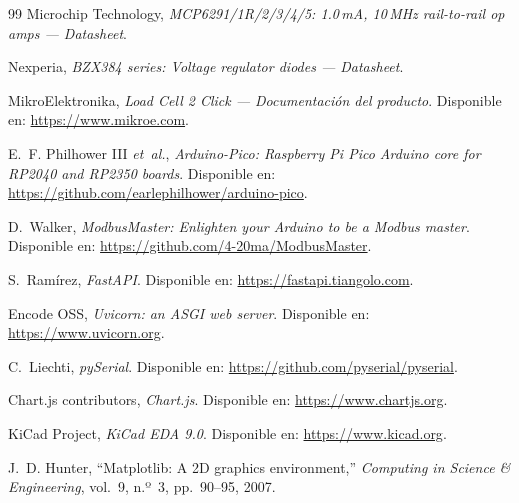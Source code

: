 \begin{thebibliography}{99}
Microchip Technology, \emph{MCP6291/1R/2/3/4/5: 1.0\,mA, 10\,MHz rail-to-rail op amps ---
Datasheet}.

Nexperia, \emph{BZX384 series: Voltage regulator diodes --- Datasheet}.

MikroElektronika, \emph{Load Cell 2 Click --- Documentación del producto}.
Disponible en: \url{https://www.mikroe.com}.

E.~F. Philhower III \emph{et~al.}, \emph{Arduino-Pico: Raspberry Pi Pico Arduino core for RP2040
and RP2350 boards}. Disponible en: \url{https://github.com/earlephilhower/arduino-pico}.

D.~Walker, \emph{ModbusMaster: Enlighten your Arduino to be a Modbus master}.
Disponible en: \url{https://github.com/4-20ma/ModbusMaster}.

S.~Ramírez, \emph{FastAPI}. Disponible en: \url{https://fastapi.tiangolo.com}.

Encode OSS, \emph{Uvicorn: an ASGI web server}. Disponible en: \url{https://www.uvicorn.org}.

C.~Liechti, \emph{pySerial}. Disponible en: \url{https://github.com/pyserial/pyserial}.

Chart.js contributors, \emph{Chart.js}. Disponible en: \url{https://www.chartjs.org}.

KiCad Project, \emph{KiCad EDA 9.0}. Disponible en: \url{https://www.kicad.org}.

J.~D. Hunter, ``Matplotlib: A 2D graphics environment,'' \emph{Computing in Science \&
Engineering}, vol.~9, n.º~3, pp.~90--95, 2007.

\end{thebibliography}
